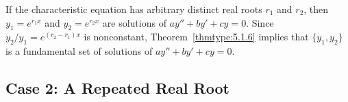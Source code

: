 \documentclass{ximera}
\begin{document}

If the characteristic equation has arbitrary distinct real roots
$r_1$ and $r_2$, then
$y_1=e^{r_1x}$ and $y_2=e^{r_2x}$  are  solutions of $ay''+by'+cy=0$.
Since $y_2/y_1=e^{(r_2-r_1)x}$ is nonconstant, Theorem~\ref{thmtype:5.1.6}
 implies that  $\{y_1,y_2\}$ is a fundamental
set of solutions of $ay''+by'+cy=0$.

\subsection*{Case 2: A Repeated Real Root}
\end{document}
